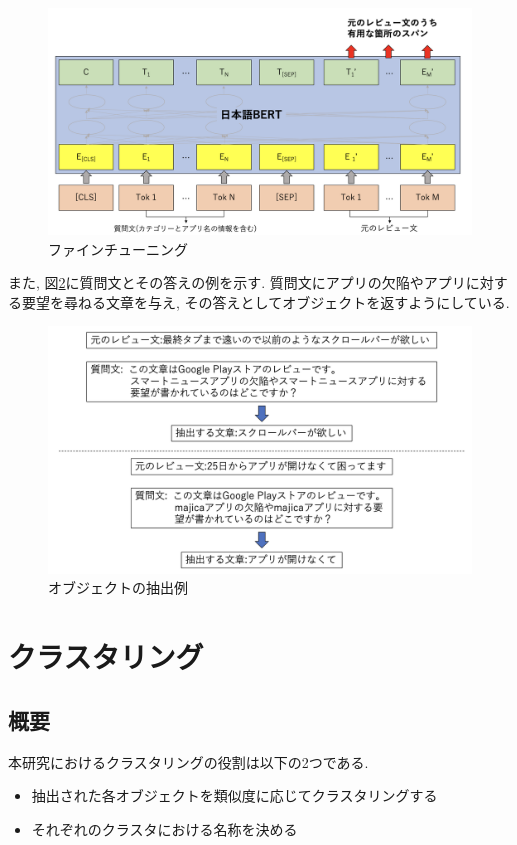 \begin{figure}[H]
  \centering
  \includegraphics[scale=0.3]
       {contents/images/fine-tuning.png}
  \caption{ファインチューニング\label{fig:fine-tuning}}
\end{figure}

また, 図\ref{fig:answer}に質問文とその答えの例を示す. 質問文にアプリの欠陥やアプリに対する要望を尋ねる文章を与え, その答えとしてオブジェクトを返すようにしている. 

\begin{figure}[H]
  \centering
  \includegraphics[scale=0.4]
       {contents/images/answer.png}
  \caption{オブジェクトの抽出例\label{fig:answer}}
\end{figure}


\section{クラスタリング}
\subsection{概要}
本研究におけるクラスタリングの役割は以下の2つである. 
\begin{itemize}
  \item 抽出された各オブジェクトを類似度に応じてクラスタリングする
  \item それぞれのクラスタにおける名称を決める
\end{itemize}

